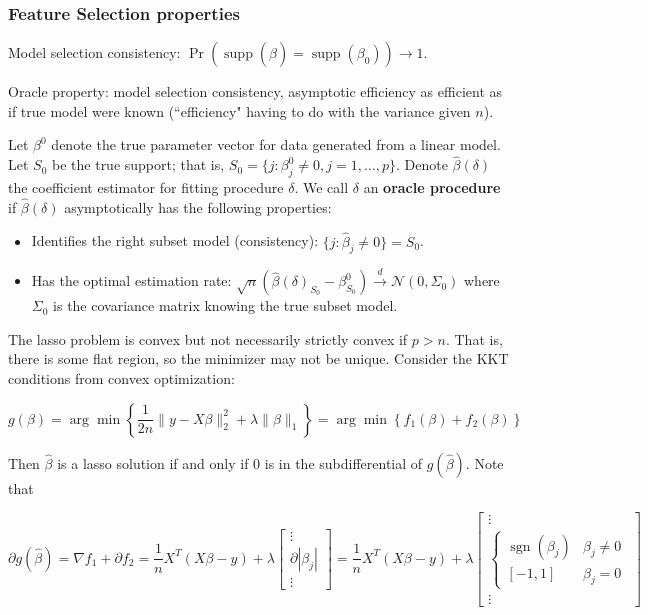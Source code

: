 \subsubsection{Feature Selection properties}

Model selection consistency: \(\Pr(\operatorname{supp}(\hat{\beta}) = \operatorname{supp}(\beta_0) ) \to 1\).

Oracle property: model selection consistency, asymptotic efficiency as efficient as if true model were known (``efficiency" having to do with the variance given \(n\)).

\begin{definition} Let \(\beta^0\) denote the true parameter vector for data generated from a linear model. Let \(S_0\) be the true support; that is, \(S_0 = \{j: \beta_j^0 \neq 0, j = 1, \ldots, p\}\). Denote \(\hat{\beta}(\delta)\) the coefficient estimator for fitting procedure \(\delta\). We call \(\delta\) an \textbf{oracle procedure} if \(\hat{\beta}(\delta)\) asymptotically has the following properties:

\begin{itemize}

\item Identifies the right subset model (consistency): \(\{j: \hat{\beta}_j \neq 0\} = S_0\).

\item Has the optimal estimation rate: \(\sqrt{n}(\hat{\beta}(\delta)_{S_0} - \beta_{S_0}^0) \xrightarrow{d} \mathcal{N}(0, \Sigma_0)\) where \(\Sigma_0\) is the covariance matrix knowing the true subset model.

\end{itemize}

\end{definition}

The lasso problem is convex but not necessarily strictly convex if \(p > n\). That is, there is some flat region, so the minimizer may not be unique. Consider the KKT conditions from convex optimization:

\[
g(\beta) = \arg \min \left\{ \frac{1}{2n} \lVert y - X \beta \rVert_2^2 + \lambda \lVert \beta \rVert_1 \right\} =  \arg \min \left\{ f_1(\beta) + f_2(\beta) \right\}
\]

Then \(\hat{\beta}\) is a lasso solution if and only if 0 is in the subdifferential of \(g(\hat{\beta})\). Note that 

\[
\partial g(\hat{\beta}) = \nabla f_1 + \partial f_2 = \frac{1}{n} X^T(X \beta - y) + \lambda \begin{bmatrix}  \vdots \\ \partial | \beta_j | \\ \vdots \end{bmatrix} = \frac{1}{n} X^T(X \beta - y) + \lambda \begin{bmatrix}  \vdots \\ \begin{cases}  \operatorname{sgn}(\beta_j) & \beta_j \neq 0 \\ [-1, 1] & \beta_j = 0 \end{cases} \\ \vdots \end{bmatrix}
\]

